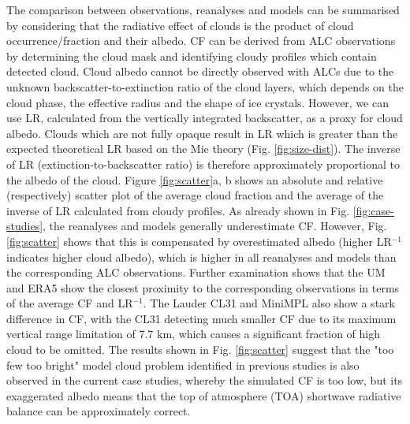 The comparison between observations, reanalyses and models can be summarised
by considering that the radiative effect of clouds is the product of
cloud occurrence/fraction and their albedo. CF can be derived
from ALC observations by determining the cloud mask and identifying cloudy
profiles which contain detected cloud. Cloud albedo cannot be
directly observed with ALCs due to the unknown backscatter-to-extinction ratio of
the cloud layers, which depends on the cloud phase, the effective radius
and the shape of ice crystals. However, we can use LR, calculated from
the vertically integrated backscatter, as a proxy for cloud albedo. Clouds which
are not fully opaque result in LR which is greater than the expected theoretical
LR based on the Mie theory (Fig. \ref{fig:size-dist}). The inverse of LR (extinction-to-backscatter ratio)
is therefore approximately proportional to the albedo of the cloud.
Figure \ref{fig:scatter}a, b shows an absolute and relative (respectively) scatter plot of the average cloud fraction
and the average of the inverse of LR calculated from cloudy profiles.
As already shown in Fig. \ref{fig:case-studies}, the reanalyses and models generally underestimate
CF. However, Fig. \ref{fig:scatter} shows that this is compensated by overestimated albedo (higher LR$^{-1}$
indicates higher cloud albedo), which is higher in all reanalyses and models
than the corresponding ALC observations. Further examination shows that the UM and ERA5 show the closest
proximity to the corresponding observations in terms of the average CF and LR$^{-1}$. The Lauder CL31 and MiniMPL
also show a stark difference in CF, with the CL31 detecting much smaller CF due
to its maximum vertical range limitation of 7.7 km, which causes a significant
fraction of high cloud to be omitted. The results shown in Fig. \ref{fig:scatter}
suggest that the "too few too bright" model cloud problem identified in
previous studies \citep{nam2012,klein2013,wall2017,kuma2020a} is also observed in the current case studies, whereby the
simulated CF is too low, but its exaggerated albedo means that
the top of atmosphere (TOA) shortwave radiative balance can be approximately
correct.

